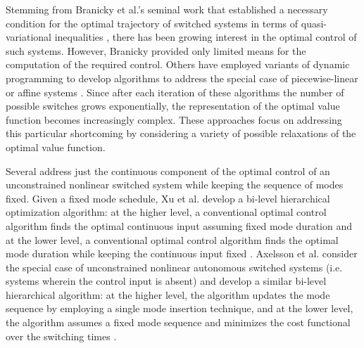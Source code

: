 Stemming from Branicky et al.'s seminal work that established a necessary condition for the optimal trajectory of switched systems in terms of quasi-variational inequalities \cite{branicky1998ufh}, there has been growing interest in the optimal control of such systems. However, Branicky provided only limited means for the computation of the required control. Others have employed variants of dynamic programming to develop algorithms to address the special case of piecewise-linear or affine systems \cite{bemporad2000piecewise,borrelli_hybrid,giua2001optimal}. Since after each iteration of these algorithms the number of possible switches grows exponentially, the representation of the optimal value function becomes increasingly complex. These approaches focus on addressing this particular shortcoming by considering a variety of possible relaxations of the optimal value function. 

Several address just the continuous component of the optimal control of an unconstrained nonlinear switched system while keeping the sequence of modes fixed. Given a fixed mode schedule, Xu et al. develop a bi-level hierarchical optimization algorithm:  at the higher level, a conventional optimal control algorithm finds the optimal continuous input assuming fixed mode duration and at the lower level, a conventional optimal control algorithm finds the optimal mode duration while keeping the continuous input fixed \cite{xu2003}. Axelsson et al. consider the special case of unconstrained nonlinear autonomous switched systems (i.e. systems wherein the control input is absent) and develop a similar bi-level hierarchical algorithm: at the higher level, the algorithm updates the mode sequence by employing a single mode insertion technique, and at the lower level, the algorithm assumes a fixed mode sequence and minimizes the cost functional over the switching times \cite{axelsson2008,egerstedt2006}. 


